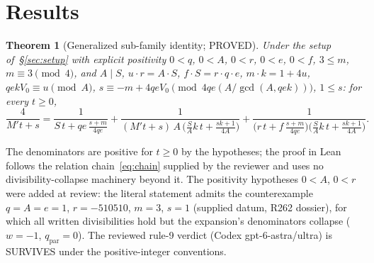 \documentclass[11pt,a4paper]{article}
\newtheorem{theorem}{Theorem}
\theoremstyle{definition}
\begin{document}
\section{Results}

\begin{theorem}[Generalized sub-family identity; PROVED]
  \label{thm:general}
  Under the setup of~\S\ref{sec:setup} with explicit positivity
  $0<q$, $0<A$, $0<r$, $0<e$, $0<f$, $3\le m$, $m\equiv3\pmod4$, and
  $A\mid S$, $u\cdot r=A\cdot S$, $f\cdot S=r\cdot q\cdot e$,
  $m\cdot k=1+4u$, $qekV_0\equiv u\pmod A$,
  $s\equiv-m+4qeV_0\pmod{4qe(A/\gcd(A,qek))}$, $1\le s$: for every
  $t\ge0$,
  \begin{equation}
    \frac{4}{M't+s}
    =\frac{1}{S\,t+qe\,\frac{s+m}{4qe}}
     +\frac{1}{(M't+s)\,A\,\bigl(\frac{S}{A}k\,t+\frac{sk+1}{4A}\bigr)}
     +\frac{1}{\bigl(r\,t+f\,\frac{s+m}{4qe}\bigr)
               \bigl(\frac{S}{A}k\,t+\frac{sk+1}{4A}\bigr)}.
  \end{equation}
\end{theorem}

The denominators are positive for $t\ge0$ by the hypotheses; the proof
in Lean follows the relation chain~\eqref{eq:chain} supplied by the
reviewer and uses no divisibility-collapse machinery beyond it. The
positivity hypotheses $0<A$, $0<r$ were added at review: the literal
statement admits the counterexample $q=A=e=1$, $r=-510510$, $m=3$,
$s=1$ (supplied datum, R262 dossier), for which all written
divisibilities hold but the expansion's denominators collapse
($w=-1$, $q_{\mathrm{par}}=0$). The reviewed rule-9 verdict (Codex
gpt-6-astra/ultra) is SURVIVES under the positive-integer conventions.
\end{document}
